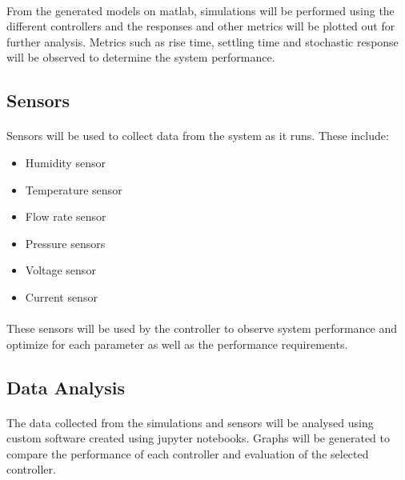 \paragraph{}From the generated models on matlab, simulations will be performed using the different controllers and the responses and other metrics will be plotted out for further analysis. Metrics such as rise time, settling time and stochastic response will be observed to determine the system performance.
\subsection{Sensors}
\paragraph{}Sensors will be used to collect data from the system as it runs. These include:
\begin{itemize}
\item Humidity sensor
\item Temperature sensor
\item Flow rate sensor
\item Pressure sensors
\item Voltage sensor
\item Current sensor
\end{itemize}
\paragraph{}These sensors will be used by the controller to observe system performance and optimize for each parameter as well as the performance requirements.
\subsection{Data Analysis}
\paragraph{}The data collected from the simulations and sensors will be analysed using custom software created using jupyter notebooks. Graphs will  be generated to compare the performance of each controller and evaluation of the selected controller.